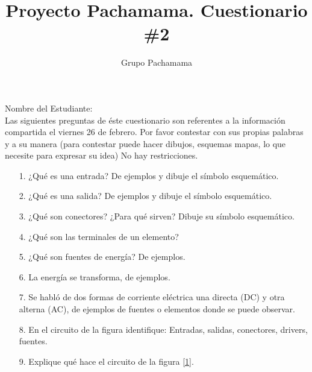 \documentclass{article}
\title{Proyecto Pachamama. Cuestionario \#2}
\author{Grupo Pachamama}
\begin{document}
\maketitle
Nombre del Estudiante:\\

Las siguientes preguntas de éste cuestionario son referentes a la información compartida el viernes 26 de febrero.
Por favor contestar con sus propias palabras y a su manera (para contestar puede hacer dibujos, esquemas mapas, lo que necesite para expresar su idea) No hay restricciones.

\begin{itemize}
		\item [1.] ¿Qué es una entrada? De ejemplos y dibuje el símbolo esquemático. 
		\item [2.] ¿Qué es una salida? De ejemplos y dibuje el símbolo esquemático.
		\item [3.] ¿Qué son conectores? ¿Para qué sirven? Dibuje su símbolo esquemático.
		\item [4.] ¿Qué son las terminales de un elemento?
		\item [5.] ¿Qué son fuentes de energía? De ejemplos.
		\item [6.] La energía se transforma, de ejemplos.
		\item [7.] Se habló de dos formas de corriente eléctrica una directa (DC) y otra alterna (AC), de ejemplos
				de fuentes o elementos donde se puede observar.
		\item [8.] En el circuito de la figura identifique: Entradas, salidas, conectores, drivers, fuentes.
		\item [9.] Explique qué hace el circuito de la figura \ref{1}.


\end{itemize}

%
\end{document}
